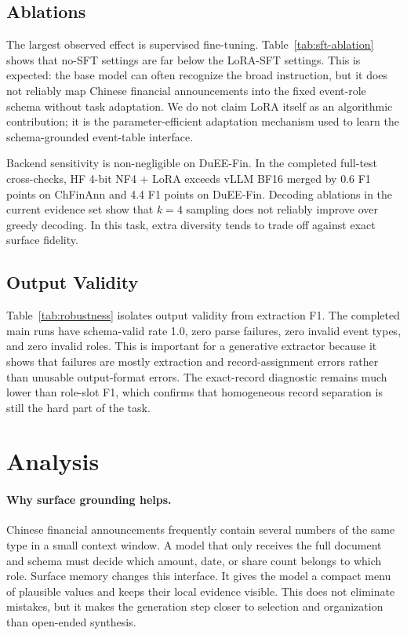 \documentclass[11pt]{article}
\begin{document}
\subsection{Ablations}



The largest observed effect is supervised fine-tuning. Table~\ref{tab:sft-ablation} shows that no-SFT settings are far below the LoRA-SFT settings. This is expected: the base model can often recognize the broad instruction, but it does not reliably map Chinese financial announcements into the fixed event-role schema without task adaptation. We do not claim LoRA itself as an algorithmic contribution; it is the parameter-efficient adaptation mechanism used to learn the schema-grounded event-table interface.



Backend sensitivity is non-negligible on DuEE-Fin. In the completed full-test cross-checks, HF 4-bit NF4 + LoRA exceeds vLLM BF16 merged by 0.6 F1 points on ChFinAnn and 4.4 F1 points on DuEE-Fin. Decoding ablations in the current evidence set show that $k=4$ sampling does not reliably improve over greedy decoding. In this task, extra diversity tends to trade off against exact surface fidelity.

\subsection{Output Validity}



Table~\ref{tab:robustness} isolates output validity from extraction F1. The completed main runs have schema-valid rate 1.0, zero parse failures, zero invalid event types, and zero invalid roles. This is important for a generative extractor because it shows that failures are mostly extraction and record-assignment errors rather than unusable output-format errors. The exact-record diagnostic remains much lower than role-slot F1, which confirms that homogeneous record separation is still the hard part of the task.

\section{Analysis}

\paragraph{Why surface grounding helps.}
Chinese financial announcements frequently contain several numbers of the same type in a small context window. A model that only receives the full document and schema must decide which amount, date, or share count belongs to which role. Surface memory changes this interface. It gives the model a compact menu of plausible values and keeps their local evidence visible. This does not eliminate mistakes, but it makes the generation step closer to selection and organization than open-ended synthesis.
\end{document}

